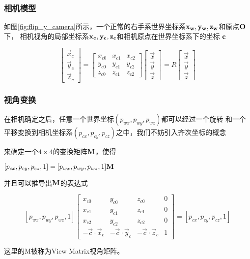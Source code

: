 \begin{frame}
    \frametitle{相机模型}

    如图\ref{fig:flip_y_camera}所示，一个正常的右手系世界坐标系$\bf{x_w,y_w,z_w}$和原点$\bf{O}$下，
    相机视角的局部坐标系$\bf{x_c,y_c,z_c}$和相机原点在世界坐标系下的坐标 $\bf{c}$
    
    $$\left[\begin{matrix} 
        \vec{x}_c \\ \vec{y}_c \\ \vec{z}_c 
    \end{matrix}\right]=
    \left[\begin{matrix} 
        x_{c0} & x_{c1} & x_{c2} \\ 
        y_{c0} & y_{c1} & y_{c2} \\ 
        z_{c0} & z_{c1} & z_{c2} 
    \end{matrix}\right]
    \left[\begin{matrix} 
        \vec{x} \\ \vec{y} \\ \vec{z} 
    \end{matrix}\right]=
    R\left[\begin{matrix} 
        \vec{x} \\ \vec{y} \\ \vec{z} 
    \end{matrix}\right]$$
\end{frame}

\begin{frame}
    \frametitle{视角变换}

    在相机确定之后，任意一个世界坐标$(p_{wx},p_{wy},p_{wz})$都可以经过一个旋转
    和一个平移变换到相机坐标系$(p_{cx},p_{cy},p_{cz})$之中，我们不妨引入齐次坐标的概念
    
    来确定一个$4\times 4$的变换矩阵$\bf{M}$，使得
    
    $[p_{cx},p_{cy},p_{cz},1]=[p_{wx},p_{wy},p_{wz},1]\bf{M}$
    
    并且可以推导出$\bf{M}$的表达式
    
    $$[p_{wx},p_{wy},p_{wz},1]
    \left[\begin{matrix} 
        x_{c0} & y_{c0} & z_{c0} & 0 \\ 
        x_{c1} & y_{c1} & z_{c1} & 0 \\ 
        x_{c2} & y_{c2} & z_{c2} & 0 \\ 
        -\vec{c}\cdot\vec{x}_c &-\vec{c}\cdot\vec{y}_c &-\vec{c}\cdot\vec{z}_c & 1 
    \end{matrix}\right]=[p_{cx},p_{cy},p_{cz}, 1]$$
    
    这里的M被称为View Matrix视角矩阵。
\end{frame}



